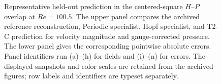 \begin{figure}[p]
\centering
{}

\vspace{0.35em}
\caption{Representative held-out prediction in the centered-square
$H$--$P$ overlap at $Re=100.5$. The upper panel compares the archived reference reconstruction, Periodic specialist, Hopf specialist, and T2-C prediction for velocity magnitude and gauge-corrected pressure. The lower panel gives the
corresponding pointwise absolute errors. Panel identifiers run (a)--(h) for fields and (i)--(n) for errors. The displayed snapshots and color scales are retained from the archived figures; row labels and identifiers are typeset separately.}
\label{fig:app_square_hp_full}
\end{figure}

\FloatBarrier

